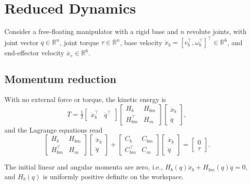 \section{Reduced Dynamics}\label{sec:model}
Consider a free-floating manipulator with a rigid base and $n$ revolute joints, with joint vector $q\in\mathbb R^n$, joint torque $\tau\in\mathbb R^n$, base velocity $\dot x_b=[v_b^\top,\omega_b^\top]^\top\in\mathbb R^6$, and end-effector velocity $\dot x_e\in\mathbb R^6$.

\subsection{Momentum reduction}
With no external force or torque, the kinetic energy is
\begin{equation}
 T=\tfrac12\begin{bmatrix}\dot x_b^\top&\dot q^\top\end{bmatrix}
 \begin{bmatrix}H_b&H_{bm}\\H_{bm}^\top&H_m\end{bmatrix}
 \begin{bmatrix}\dot x_b\\\dot q\end{bmatrix},
 \label{eq:kinetic}
\end{equation}
and the Lagrange equations read
\begin{equation}
 \begin{bmatrix}H_b&H_{bm}\\H_{bm}^\top&H_m\end{bmatrix}
 \begin{bmatrix}\ddot x_b\\\ddot q\end{bmatrix}
 +\begin{bmatrix}C_b&C_{bm}\\C_{bm}^\top&C_m\end{bmatrix}
 \begin{bmatrix}\dot x_b\\\dot q\end{bmatrix}
 =\begin{bmatrix}0\\\tau\end{bmatrix}.
 \label{eq:full}
\end{equation}

\begin{assumption}\label{as:momentum}
The initial linear and angular momenta are zero, i.e.,
$H_b(q)\dot x_b+H_{bm}(q)\dot q=0$, and $H_b(q)$ is uniformly positive
definite on the workspace.
\end{assumption}

